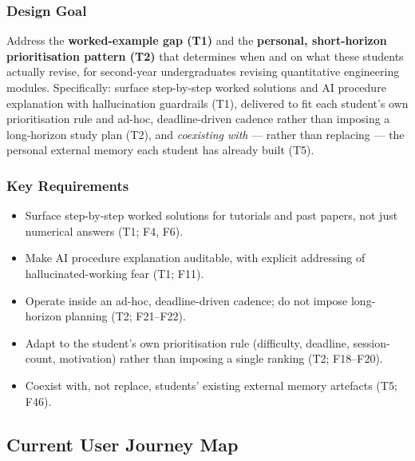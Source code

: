 \documentclass[a4paper,11pt]{article}
\begin{document}
\subsubsection*{Design Goal}

Address the \textbf{worked-example gap (T1)} and the
\textbf{personal, short-horizon prioritisation pattern (T2)} that
determines when and on what these students actually revise, for
second-year undergraduates revising quantitative engineering
modules. Specifically: surface step-by-step worked solutions and
AI procedure explanation with hallucination guardrails (T1),
delivered to fit each student's own prioritisation rule and ad-hoc,
deadline-driven cadence rather than imposing a long-horizon study
plan (T2), and \emph{coexisting with} --- rather than replacing ---
the personal external memory each student has already built (T5).

\subsubsection*{Key Requirements}

\begin{itemize}
  \item Surface step-by-step worked solutions for tutorials and past
        papers, not just numerical answers (T1; F4, F6).
  \item Make AI procedure explanation auditable, with explicit
        addressing of hallucinated-working fear (T1; F11).
  \item Operate inside an ad-hoc, deadline-driven cadence; do not
        impose long-horizon planning (T2; F21--F22).
  \item Adapt to the student's own prioritisation rule (difficulty,
        deadline, session-count, motivation) rather than imposing a
        single ranking (T2; F18--F20).
  \item Coexist with, not replace, students' existing external memory
        artefacts (T5; F46).
\end{itemize}

\newpage
\subsection{Current User Journey Map}\label{sec:journey}
%
\end{document}
